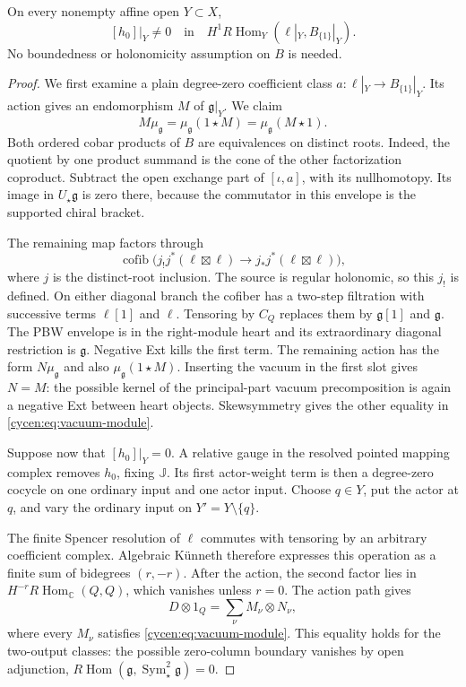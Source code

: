 \begin{lemma}\label{cycen:lem:singleton}
On every nonempty affine open $Y\subset X$,
\[
 [h_0]|_Y\ne0
 \quad\text{in}\quad
 H^1R\operatorname{Hom}_{Y}
              (\ell|_Y,B_{\{1\}}|_Y).
\]
No boundedness or holonomicity assumption on $B$ is needed.
\end{lemma}
\begin{proof}
We first examine a plain degree-zero coefficient class
$a:\ell|_Y\to B_{\{1\}}|_Y$. Its action gives an
endomorphism $M$ of $\mathfrak g|_Y$. We claim
\begin{equation}\label{cycen:eq:vacuum-module}
 M\mu_{\mathfrak g}
 =\mu_{\mathfrak g}(1\star M)
 =\mu_{\mathfrak g}(M\star1).
\end{equation}
Both ordered cobar products of $B$ are equivalences
on distinct roots. Indeed, the quotient by one product
summand is the cone of the other factorization
coproduct. Subtract the open exchange part of
$[\iota,a]$, with its nullhomotopy. Its image in
$U_\star\mathfrak g$ is zero there, because the
commutator in this envelope is the supported chiral
bracket.

The remaining map factors through
\[
 \operatorname{cofib}\bigl(j_!j^*(\ell\boxtimes\ell)
                    \longrightarrow
                         j_*j^*(\ell\boxtimes\ell)\bigr),
\]
where $j$ is the distinct-root inclusion. The source
is regular holonomic, so this $j_!$ is defined.
On either diagonal branch the cofiber has a
two-step filtration with successive terms $\ell[1]$
and $\ell$. Tensoring by $C_Q$ replaces them by
$\mathfrak g[1]$ and $\mathfrak g$. The PBW
envelope is in the right-module heart and its
extraordinary diagonal restriction is $\mathfrak g$.
Negative Ext kills the first term. The remaining
action has the form $N\mu_{\mathfrak g}$ and also
$\mu_{\mathfrak g}(1\star M)$. Inserting the vacuum
in the first slot gives $N=M$: the possible kernel
of the principal-part vacuum precomposition is
again a negative Ext between heart objects.
Skewsymmetry gives the other equality in
\eqref{cycen:eq:vacuum-module}.

Suppose now that $[h_0]|_Y=0$. A relative gauge in
the resolved pointed mapping complex removes
$h_0$, fixing $\mathbb J$. Its first actor-weight
term is then a degree-zero cocycle on one ordinary
input and one actor input. Choose $q\in Y$,
put the actor at $q$, and vary the ordinary input
on $Y'=Y\setminus\{q\}$.

The finite Spencer resolution of $\ell$ commutes
with tensoring by an arbitrary coefficient complex.
Algebraic K\"unneth therefore expresses this
operation as a finite sum of bidegrees $(r,-r)$.
After the action, the second factor lies in
$H^{-r}R\operatorname{Hom}_{\mathbb C}(Q,Q)$,
which vanishes unless $r=0$. The action path gives
\[
              D\otimes1_Q=\sum_\nu M_\nu\otimes N_\nu,
\]
where every $M_\nu$ satisfies
\eqref{cycen:eq:vacuum-module}. This equality holds
for the two-output classes: the possible
zero-column boundary vanishes by open adjunction,
$R\operatorname{Hom}(\mathfrak g,
             \operatorname{Sym}^2_\star\mathfrak g)=0$.


\end{proof}
